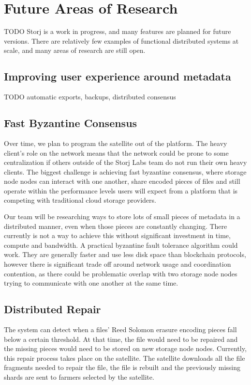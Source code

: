 \documentclass[a4paper,10pt]{article} \usepackage[utf8]{inputenc}
\newcommand{\todo}[1]{{\color{red} TODO #1 }}
\begin{document}
\section{Future Areas of Research}\label{sec:future_work}

\todo{ Storj is a work in progress, and many features are planned for future
versions. There are relatively few examples of functional distributed systems at
scale, and many areas of research are still open. }

\subsection{Improving user experience around metadata}

\todo{automatic exports, backups, distributed consensus}

\subsection{Fast Byzantine Consensus}

Over time, we plan to program the satellite out of the platform. The heavy
client's role on the network means that the network could be prone to some
centralization if others outside of the Storj Labs team do not run their own
heavy clients. The biggest challenge is achieving fast byzantine consensus,
where storage node nodes can interact with one another, share encoded pieces of 
files
and still operate within the performance levels users will expect from a
platform that is competing with traditional cloud storage providers.

Our team will be researching ways to store lots of small pieces of metadata
in a distributed manner, even when those pieces are constantly changing. There
currently is not a way to achieve this without significant investment in time,
compute and bandwidth. A practical byzantine fault tolerance algorithm could
work. They are generally faster and use less disk space than blockchain
protocols, however there is significant trade off around network usage and
coordination contention, as there could be problematic overlap with two storage 
node
nodes trying to communicate with one another at the same time.

\subsection{Distributed Repair}

The system can detect when a files' Reed Solomon erasure encoding pieces fall
below a certain threshold. At that time, the file would need to be repaired and
the missing pieces would need to be stored on new storage node nodes. 
Currently, this
repair process takes place on the satellite. The satellite downloads all
the file fragments needed to repair the file, the file is rebuilt and the
previously missing shards are sent to farmers selected by the satellite.
\end{document}
